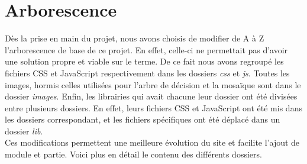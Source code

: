 \documentclass[twoside]{EPURapport}
\begin{document}
	\section{Arborescence}
	Dès la prise en main du projet, nous avons choisis de modifier de A à Z l'arborescence de base de ce projet. En effet, celle-ci ne permettait pas d'avoir une solution propre et viable sur le terme. De ce fait nous avons regroupé les fichiers CSS et JavaScript respectivement dans les dossiers \emph{css} et \emph{js}. Toutes les images, hormis celles utilisées pour l'arbre de décision et la mosaïque sont dans le dossier \emph{images}. Enfin, les librairies qui avait chacune leur dossier ont été divisées entre plusieurs dossiers. En effet, leurs fichiers CSS et JavaScript ont été mis dans les dossiers correspondant, et les fichiers spécifiques ont été déplacé dans un dossier \emph{lib}.\\

	Ces modifications permettent une meilleure évolution du site et facilite l'ajout de module et partie. Voici plus en détail le contenu des différents dossiers.
	
\end{document}
